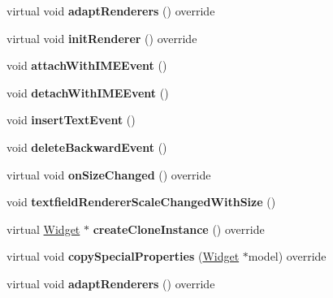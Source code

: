 \begin{DoxyCompactItemize}
virtual void {\bfseries adapt\+Renderers} () override
\item 
\mbox{\label{classui_1_1TextField_a9e1218baa7e5476755fc94f7803553c1}} 
virtual void {\bfseries init\+Renderer} () override
\item 
\mbox{\label{classui_1_1TextField_abd1681a6ef446a861177847332f5ae7d}} 
void {\bfseries attach\+With\+I\+M\+E\+Event} ()
\item 
\mbox{\label{classui_1_1TextField_a9d7c3e395f70c099b956a5bbac90e211}} 
void {\bfseries detach\+With\+I\+M\+E\+Event} ()
\item 
\mbox{\label{classui_1_1TextField_a79c3e3b5e8d5e988b411b6b677334e19}} 
void {\bfseries insert\+Text\+Event} ()
\item 
\mbox{\label{classui_1_1TextField_aa398b25931127f0769f8adad3cb10185}} 
void {\bfseries delete\+Backward\+Event} ()
\item 
\mbox{\label{classui_1_1TextField_a75be3f3a3d1d52f457df6101c3b85da7}} 
virtual void {\bfseries on\+Size\+Changed} () override
\item 
\mbox{\label{classui_1_1TextField_aa0357d9bb9ee208e2eb328224048ad1a}} 
void {\bfseries textfield\+Renderer\+Scale\+Changed\+With\+Size} ()
\item 
\mbox{\label{classui_1_1TextField_aa5e9feedc8d621a4825e03b032c9bb30}} 
virtual \hyperlink{classui_1_1Widget}{Widget} $\ast$ {\bfseries create\+Clone\+Instance} () override
\item 
\mbox{\label{classui_1_1TextField_a0c62017356e7157e7793c989b85aa019}} 
virtual void {\bfseries copy\+Special\+Properties} (\hyperlink{classui_1_1Widget}{Widget} $\ast$model) override
\item 
\mbox{\label{classui_1_1TextField_aa08931d0236b727b68c733cda6d1c605}} 
virtual void {\bfseries adapt\+Renderers} () override
\end{DoxyCompactItemize}

